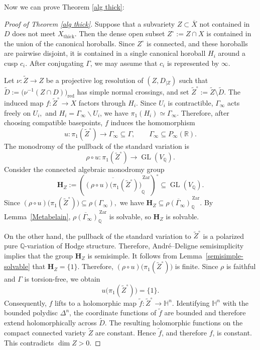 \documentclass[12 pt]{amsart}
\theoremstyle{definition}
\begin{document}
Now we can prove Theorem \ref{alg thick}:


\begin{proof}[Proof of Theorem \ref{alg thick}]


Suppose that a subvariety $Z\subset\overline X$ not contained in $D$
does not meet $X_{\mathrm{thick}}$. Then the dense open subset
\(
Z^\circ:=Z\cap X
\)
is contained in the union of the canonical horoballs. Since $Z^\circ$
is connected, and these horoballs are pairwise
disjoint, it is contained in a single canonical horoball $H_i$ around
a cusp $c_i$. After conjugating $\Gamma$, we may assume that $c_i$ is
represented by $\infty$.

Let $\nu:\widetilde Z\to Z$ be a projective log resolution of
$(Z, D_{|Z})$ such that
\(
\widetilde{D}:=\bigl(\nu^{-1}(Z\cap D)\bigr)_{\mathrm{red}}
\)
has simple normal crossings, and set
\(
\widetilde Z^\circ:=\widetilde Z\setminus \widetilde{D}.
\)
The induced map
\(
f:\widetilde Z^\circ\to X
\)
factors through $H_i$. Since $U_i$ is contractible, $\Gamma_\infty$ acts freely on $U_i,$
and $H_i=\Gamma_\infty\backslash U_i$, we
have
\(
\pi_1(H_i)\simeq\Gamma_\infty.
\)
Therefore, after choosing compatible basepoints, \(f\) induces the
homomorphism
\[
u:\pi_1(\widetilde Z^\circ)\longrightarrow
\Gamma_\infty\subseteq\Gamma,\qquad
\Gamma_\infty\subseteq P_\infty(\mathbb R).
\]
The monodromy of the pullback of the standard variation is
\[
\rho\circ u:
\pi_1(\widetilde Z^\circ)
\longrightarrow\operatorname{GL}(V_{\mathbb Q}).
\]
 Consider the connected algebraic monodromy group
\[
\mathbf H_Z
:=
\left(
\overline{
(\rho\circ u)\bigl(\pi_1(\widetilde Z^\circ)\bigr)
}^{\,\mathrm{Zar}}_{\mathbb Q}
\right)^\circ
\subseteq\operatorname{GL}(V_{\mathbb Q}).
\]
Since
\(
(\rho\circ u)\bigl(\pi_1(\widetilde Z^\circ)\bigr)
\subseteq \rho(\Gamma_\infty),
\)
we have
\(
\mathbf H_Z
\subseteq
\overline{\rho(\Gamma_\infty)}^{\,\mathrm{Zar}}_{\mathbb Q}.
\)
By Lemma~\ref{Metabelain}, $\overline{\rho(\Gamma_\infty)}^{\,\mathrm{Zar}}_{\mathbb Q}$ is solvable,
so $\mathbf H_Z$ is solvable.

On the
other hand, the pullback of the standard variation to
\(\widetilde Z^\circ\) is a polarized pure \(\mathbb Q\)-variation of Hodge
structure. Therefore, André--Deligne semisimplicity
\cite[Corollary~1]{andre1992mumford} implies that the group \(\mathbf H_Z\) is semisimple. It follows
from Lemma~\ref{semisimple-solvable} that
\(\mathbf H_Z=\{1\}\). Therefore,
\((\rho\circ u)\bigl(\pi_1(\widetilde Z^\circ)\bigr)\) is finite.
Since \(\rho\) is faithful and \(\Gamma\) is torsion-free, we obtain
\[
u\bigl(\pi_1(\widetilde Z^\circ)\bigr)=\{1\}.
\]
Consequently, $f$ lifts to a holomorphic map
\(
\widetilde f:\widetilde Z^\circ\longrightarrow\mathbb H^n.
\)
Identifying $\mathbb H^n$ with the bounded polydisc $\Delta^n$, the
coordinate functions of $\widetilde f$ are bounded and therefore extend
holomorphically across $\widetilde{D}$. The resulting holomorphic functions on the
compact connected variety $\widetilde Z$ are constant. Hence
$\widetilde f$, and therefore $f$, is constant. This contradicts
$\dim Z>0$.
\end{proof}
\end{document}
